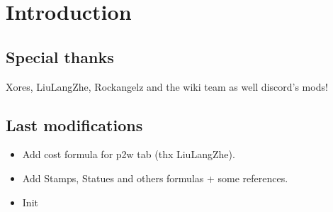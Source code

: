 \chapter{Introduction}

    \section{Special thanks}
    Xores, LiuLangZhe, Rockangelz and the wiki team as well discord's mods!
    \section{Last modifications}
        \begin{itemize}
            \item Add cost formula for p2w tab (thx LiuLangZhe).
            \item Add Stamps, Statues and others formulas + some references. 
            \item Init
        \end{itemize}